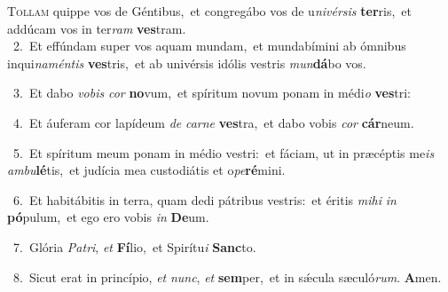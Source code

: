 \lettrine{\initial\textcolor{\initialcolor}{T}}{ollam} quippe vos de Géntibus,~\dagger et congregábo vos de u\-\textit{ni}\-\textit{vér}\textit{sis} \textbf{ter}\-ris,~\star et addúcam vos in ter\textit{ram} \textbf{ves}\-tram.\\
{\numbfont\textcolor{\numbcolor}{~2.}}~Et effúndam super vos aquam mundam,~\dagger et mundabímini ab ómnibus inqui\-\textit{na}\-\textit{mén}\textit{tis} \textbf{ves}\-tris,~\star et ab univérsis idólis vestris \textit{mun}\-\textbf{dá}bo vos.\par
{\numbfont\textcolor{\numbcolor}{~3.}}~Et dabo \textit{vo}\-\textit{bis} \textit{cor} \textbf{no}\-vum,~\star et spíritum novum ponam in médi\textit{o} \textbf{ves}\-tri:\par
{\numbfont\textcolor{\numbcolor}{~4.}}~Et áuferam cor lapídeum \textit{de} \textit{car}\-\textit{ne} \textbf{ves}\-tra,~\star et dabo vobis \textit{cor} \textbf{cár}\-neum.\par
{\numbfont\textcolor{\numbcolor}{~5.}}~Et spíritum meum ponam in médio vestri:~\dagger et fáciam, ut in præcéptis me\textit{is} \textit{am}\-\textit{bu}\textbf{lé}tis,~\star et judícia mea custodiátis et o\-\textit{pe}\-\textbf{ré}mini.\par
{\numbfont\textcolor{\numbcolor}{~6.}}~Et habitábitis in terra, quam dedi pátribus vestris:~\dagger et éritis \textit{mi}\-\textit{hi} \textit{in} \textbf{pó}\-pulum,~\star et ego ero vobis \textit{in} \textbf{De}\-um.\par
{\numbfont\textcolor{\numbcolor}{~7.}}~Glória \textit{Pa}\-\textit{tri}, \textit{et} \textbf{Fí}\-lio,~\star et Spirítu\textit{i} \textbf{Sanc}\-to.\par
{\numbfont\textcolor{\numbcolor}{~8.}}~Sicut erat in princípio, \textit{et} \textit{nunc}\-, \textit{et} \textbf{sem}\-per,~\star et in sǽcula sæculó\-\textit{rum}\-. \textbf{A}\-men.\par
